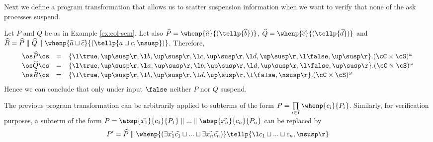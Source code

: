 \documentclass{tlp}
\begin{document}
Next we define a program transformation that allows us to scatter suspension information when we want to verify that none of the ask processes suspend. 

\begin{example} Let $P$ and $Q$ be as in Example  \ref{ex:col-sem}. Let also  $\widehat{P}  =  \whenp{\widehat{a}}{(\tellp{\widehat{b}} )}$, $\widehat{Q} = \whenp{\widehat{c}}{(\tellp{\widehat{d}} )} $ and
$
\widehat{R} = \widehat{P} \parallel \widehat{Q} \parallel \whenp{\widehat{a} \sqcup \widehat{c}}{(\tellp{a\sqcup c, \nsusp} )}
$. Therefore, 
\[
\begin{array}{rll}
\os \widehat{P}\cs &=& \{\l \true,\up\susp\r, \l b,\up\susp\r, \l c ,\up\susp\r , \l d ,\up\susp\r, \l \false,\up\susp\r \}.(\cC\times \cS)^\omega\\
\os \widehat{Q}\cs &=& \{\l \true,\up\susp\r, \l a,\up\susp\r, \l b ,\up\susp\r , \l d ,\up\susp\r, \l \false,\up\susp\r \}.(\cC\times \cS)^\omega\\
\os \widehat{R}\cs & = & \{\l \true,\up\susp\r, \l b,\up\susp\r, \l d ,\up\susp\r, \l \false,\nsusp\r \}.(\cC\times \cS)^\omega
\end{array}
\]
Hence we can conclude that only under input $\false$  
 neither $P$ nor $Q$  suspend. 
\end{example}

The previous program transformation can be arbitrarily applied to subterms of the form $P=\prod\limits_{i\in I} \whenp{c_i}{P_i}$. Similarly, for verification purposes, a subterm of the form 
$P = \absp{\vec{x_1}}{c_1}{P_1} \parallel ... \parallel \absp{\vec{x_n}}{c_n}{P_n} 
$ can be replaced by 
\[
P' = \widehat{P} \parallel \whenp{(\exists{\vec{x_1}} \widehat{c_1} \sqcup...\sqcup \exists {\vec{x_n}} \widehat{c_n})}\tellp{\l c_1 \sqcup ... \sqcup c_n, \nsusp\r }
\] 
\end{document}
